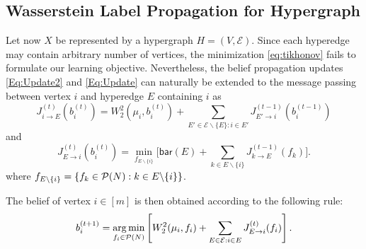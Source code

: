\documentclass[letterpaper]{article} %
\begin{document}


\subsection{Wasserstein Label Propagation for Hypergraph}
Let now $X$ be represented by a hypergraph $H=(V, \mathcal E)$. Since each hyperedge may contain arbitrary number of vertices, the minimization \eqref{eq:tikhonov} fails to formulate our learning objective. Nevertheless, the belief propagation updates \eqref{Eq:Update2} and \eqref{Eq:Update} can naturally be extended to the message passing between vertex $i$ and hyperedge $E$ containing $i$ as 
\begin{equation}\label{Eq:Update_H_2}
J^{(t)}_{i\to E} \left(b_i^{(t)}\right) = W_2^2\left(\mu_i, b_i^{(t)}\right) + \sum_{E'\in \mathcal E\backslash\{E\}: i\in E'}J^{(t-1)}_{E'\to i}\left(b_i^{(t-1)}\right)
\end{equation}
and 
\begin{equation}\label{Eq:Update_H}
    J^{(t)}_{E\to i}\left(b_i^{(t)}\right) =  \min_{f_{E\backslash \{i\}}}\Big[\mathsf{bar}(E) + \sum_{k\in E\backslash \{i\}}J^{(t-1)}_{k\to E}(f_k)\Big].
\end{equation}
where  $f_{E\backslash \{i\}}=\{f_k\in\P(N): k\in E\backslash\{i\}\}$.

The belief of vertex $i\in [m]$ is then obtained according to the following rule:
$$b_i^{(t+1)}=\argmin_{f_i\in \P(N)}\left[W_2^2(\mu_i, f_i) + \sum_{E\in \mathcal{E}:i\in E}J^{(t)}_{E\to i}(f_i)\right].$$
\end{document}
